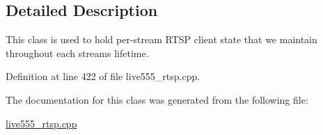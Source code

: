 \subsection{Detailed Description}
This class is used to hold per-\/stream R\+T\+SP client state that we maintain throughout each stream\textquotesingle{}s lifetime. 

Definition at line 422 of file live555\+\_\+rtsp.\+cpp.



The documentation for this class was generated from the following file\+:\begin{DoxyCompactItemize}
\item 
\hyperlink{live555__rtsp_8cpp}{live555\+\_\+rtsp.\+cpp}\end{DoxyCompactItemize}
